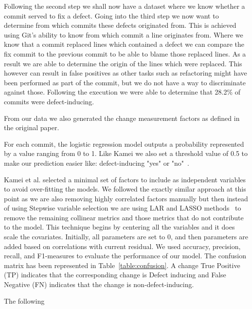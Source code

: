 \documentclass[10pt, conference]{IEEEtran}
\begin{document}
Following the second step we shall now have a dataset where we know whether a commit served to fix a defect. Going into the third step we now want to determine from which commits these defects originated from. This is achieved using Git's ability to know from which commit a line originates from. Where we know that a commit replaced lines which contained a defect we can compare the fix commit to the previous commit to be able to blame those replaced lines. As a result we are able to determine the origin of the lines which were replaced. This however can result in false positives as other tasks such as refactoring might have been performed as part of the commit, but we do not have a way to discriminate against those. Following the execution we were able to determine that 28.2\% of commits were defect-inducing. 

From our data we also generated the change measurement factors as defined in the original paper.  




For each commit, the logistic regression model outputs a probability represented by a value ranging from 0 to 1. Like Kamei we also set a threshold value of 0.5 to make our prediction easier like: defect-inducing "yes" or "no"~\cite{Gyimothy2005TSE,Guo2010ICSE}.

Kamei et al. selected a minimal set of factors to include as independent variables to avoid over-fitting the models. We followed the exactly similar approach at this point as we are also removing highly correlated factors manually but then instead of using Stepwise variable selection we are using LAR and LASSO methods~\cite{Flom2007NESUG} to remove the remaining collinear metrics and those metrics that do not contribute to the model. This technique begins by centering all the variables and it does scale the covariates. Initially, all parameters are set to 0, and then parameters are added based on correlations with current residual. 
We used accuracy, precision, recall, and F1-measures to evaluate the performance of our model. The confusion matrix has been represented in Table~\ref{table:confusion}. A change True Positive (TP) indicates that the corresponding change is Defect inducing and False Negative (FN) indicates that the change is non-defect-inducing.







The following 
\end{document}
